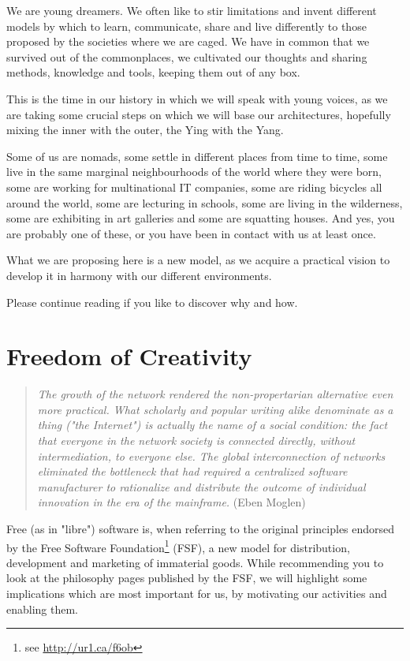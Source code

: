 We are young dreamers. We often like to stir limitations and invent
dif\hbox{}ferent models by which to learn, communicate, share and live
dif\hbox{}ferently to those proposed by the societies where we are caged. We
have in common that we survived out of the commonplaces, we cultivated our
thoughts and sharing methods, knowledge and tools, keeping them out of any box.

This is the time in our history in which we will speak with young voices, as we
are taking some crucial steps on which we will base our architectures, hopefully
mixing the inner with the outer, the Ying with the Yang.

Some of us are nomads, some settle in dif\hbox{}ferent places from time to time,
some live in the same marginal neighbourhoods of the world where they were born,
some are working for multinational IT companies, some are riding bicycles all
around the world, some are lecturing in schools, some are living in the
wilderness, some are exhibiting in art galleries and some are squatting houses.
And yes, you are probably one of these, or you have been in contact with us at
least once.

What we are proposing here is a new model, as we acquire a practical vision to
develop it in harmony with our dif\hbox{}ferent environments.

Please continue reading if you like to discover why and how.


\section{Freedom of Creativity}
\label{s:weaver_birds:freedom_creativity}

\begin{quote}
\textit{The growth of the network rendered the non-propertarian alternative even
more practical. What scholarly and popular writing alike denominate as a thing
("the Internet") is actually the name of a social condition: the fact that
everyone in the network society is connected directly, without intermediation,
to everyone else. The global interconnection of networks eliminated the
bottleneck that had required a centralized software manufacturer to rationalize
and distribute the outcome of individual innovation in the era of the
mainframe.} (Eben Moglen)
\end{quote}

Free (as in "libre") software is, when referring to the original principles
endorsed by the Free Software Foundation\footnote{see \url{http://ur1.ca/f6ob}}
(FSF), a new model for distribution, development and marketing of immaterial
goods. While recommending you to look at the philosophy pages published by the
FSF, we will highlight some implications which are most important for us, by
motivating our activities and enabling them.

